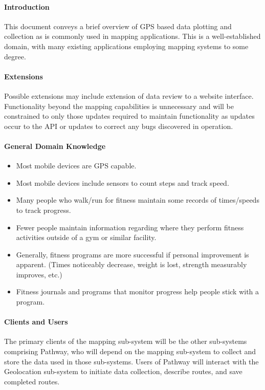 ﻿\documentclass{article}
\begin{document}
\paragraph{Introduction}
This document conveys a brief overview of GPS based data plotting and collection as is commonly used in mapping applications. This is a well-established domain, with many existing applications employing mapping systems to some degree.

\paragraph{Extensions}
Possible extensions may include extension of data review to a website interface. Functionality beyond the mapping capabilities is unnecessary and will be constrained to only those updates required to maintain functionality as updates occur to the API or updates to correct any bugs discovered in operation.

\paragraph{General Domain Knowledge}
\begin{itemize}
    \item  Most mobile devices are GPS capable.
    \item Most mobile devices include sensors to count steps and track speed.
    \item Many people who walk/run for fitness maintain some records of times/speeds to track progress.
    \item Fewer people maintain information regarding where they perform fitness activities outside of a gym or similar facility.
    \item Generally, fitness programs are more successful if personal improvement is apparent. (Times noticeably decrease, weight is lost, strength measurably improves, etc.)
    \item Fitness journals and programs that monitor progress help people stick with a program.
\end{itemize}

\paragraph{Clients and Users}
The primary clients of the mapping sub-system will be the other sub-systems comprising Pathway, who will depend on the mapping sub-system to collect and store the data used in those sub-systems. Users of Pathway will interact with the Geolocation sub-system to initiate data collection, describe routes, and save completed routes.
\end{document}

